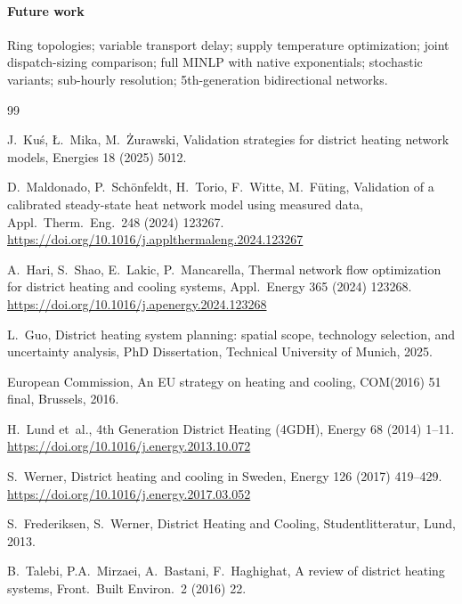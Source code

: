 \documentclass[review,3p]{elsarticle}
\begin{document}
\paragraph{Future work}
Ring topologies; variable transport delay; supply temperature
optimization; joint dispatch-sizing comparison; full MINLP with
native exponentials; stochastic variants; sub-hourly resolution;
5th-generation bidirectional networks.


\begin{thebibliography}{99}

J.~Ku\'{s}, {\L}.~Mika, M.~{\.Z}urawski,
Validation strategies for district heating network models,
Energies 18 (2025) 5012.

D.~Maldonado, P.~Sch\"{o}nfeldt, H.~Torio, F.~Witte, M.~F\"{u}ting,
Validation of a calibrated steady-state heat network model using
measured data,
Appl.\ Therm.\ Eng.\ 248 (2024) 123267.
\url{https://doi.org/10.1016/j.applthermaleng.2024.123267}

A.~Hari, S.~Shao, E.~Lakic, P.~Mancarella,
Thermal network flow optimization for district heating and cooling
systems,
Appl.\ Energy 365 (2024) 123268.
\url{https://doi.org/10.1016/j.apenergy.2024.123268}

L.~Guo,
District heating system planning: spatial scope, technology selection,
and uncertainty analysis,
PhD Dissertation, Technical University of Munich, 2025.

European Commission, An EU strategy on heating and cooling,
COM(2016) 51 final, Brussels, 2016.

H.~Lund et~al.,
4th Generation District Heating (4GDH),
Energy 68 (2014) 1--11.
\url{https://doi.org/10.1016/j.energy.2013.10.072}

S.~Werner,
District heating and cooling in Sweden,
Energy 126 (2017) 419--429.
\url{https://doi.org/10.1016/j.energy.2017.03.052}

S.~Frederiksen, S.~Werner,
District Heating and Cooling, Studentlitteratur, Lund, 2013.

B.~Talebi, P.A.~Mirzaei, A.~Bastani, F.~Haghighat,
A review of district heating systems,
Front.\ Built Environ.\ 2 (2016) 22.


\end{thebibliography}
\end{document}
